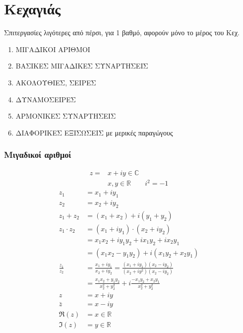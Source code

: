 \documentclass[12pt,a4paper,notitlepage,fleqn]{article}
\begin{document}
	\newpage


	\part{Κεχαγιάς}
	Σπιτεργασίες λιγότερες από πέρσι, για 1 βαθμό, αφορούν μόνο το μέρος του Κεχ.
	\begin{enumerate}
		\item ΜΙΓΑΔΙΚΟΙ ΑΡΙΘΜΟΙ
		\item ΒΑΣΙΚΕΣ ΜΙΓΑΔΙΚΕΣ ΣΥΝΑΡΤΗΣΕΙΣ
		\item ΑΚΟΛΟΥΘΙΕΣ, ΣΕΙΡΕΣ
		\item ΔΥΝΑΜΟΣΕΙΡΕΣ
		\item ΑΡΜΟΝΙΚΕΣ ΣΥΝΑΡΤΗΣΕΙΣ
		\item ΔΙΑΦΟΡΙΚΕΣ ΕΞΙΣΩΣΕΙΣ με μερικές παραγώγους
	\end{enumerate}

	\section{Μιγαδικοί αριθμοί}
	\begin{align*}
	    z = & x+iy \in \mathbb C \\
	    & x,y \in \mathbb R \qquad i^2=-1
	\end{align*}
	\begin{align*}
	z_1 &= x_1 +iy_1 \\
	z_2 &= x_2 +iy_2 \\
	z_1+z_2 &= (x_1+x_2)+i(y_1+y_2) \\
	z_1\cdot z_2 &= (x_1+iy_1)\cdot(x_2+iy_2) \\
	&= x_1x_2+iy_1y_2+ix_1y_2+ix_2y_1 \\
	&= (x_1x_2-y_1y_2)+i(x_1y_2+x_2y_1) \\
	\frac{z_1}{z_2} &= \frac{x_1+iy_1}{x_2+iy_2}
	= \frac{(x_1+iy_1)(x_2-iy_2)}{(x_2+iy^2)(x_2-iy_2)}
	\\ &= \frac{x_1x_2+y_1y_2}{x_2^2+y_2^2} + i \frac{-x_1y_2+x_2y_1}{x_2^2+y_2^2}
	\\ z &= x+iy
	\\ \bar{z} &= x-iy
	\\ \Re(z) &= x \in \mathbb R
	\\ \Im(z) &= y \in \mathbb R
	\end{align*}
\end{document}
